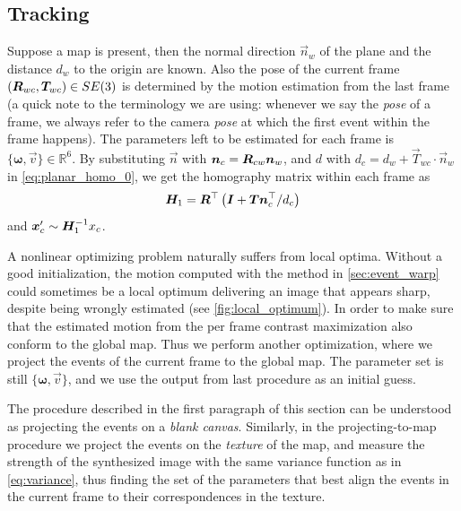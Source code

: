 \subsection{Tracking}
\label{sec:tracking}
Suppose a map is present, then the normal direction $\vec{n}_w$ of the
plane and the distance $d_w$ to the origin are known. Also the pose of
the current frame $(\mat{R}_{wc}, \vec{T}_{wc})\in SE(3)$ is
determined by the motion estimation from the last frame (a quick note
to the terminology we are using: whenever we say the \textit{pose} of
a frame, we always refer to the camera \textit{pose} at which the
first event within the frame happens). The parameters left to be
estimated for each frame is
$\{\bm{\omega},\vec{v}\}\in\mathbb{R}^6$. By substituting $\vec{n}$
with $\vec{n}_c = \mat{R}_{cw}\vec{n}_w$, and $d$ with
$d_c = d_w+\vec{T}_{wc}\cdot\vec{n}_w$ in \cref{eq:planar_homo_0}, we
get the homography matrix within each frame as
\begin{equation}
  \label{eq:planar_homo_1}
  \mat{H}_1=\mat{R}^\top\left(\mat{I}+\vec{T}\vec{n}_c^\top/d_c\right)
\end{equation}
and $\vec{x}'_c\sim\mat{H}_1^{-1}x_c$.

A nonlinear optimizing problem naturally suffers from local
optima. Without a good initialization, the motion computed with the
method in \cref{sec:event_warp} could sometimes be a local optimum
delivering an image that appears sharp, despite being wrongly
estimated (see \cref{fig:local_optimum}). In order to make sure that
the estimated motion from the per frame contrast maximization also
conform to the global map. Thus we perform another optimization, where
we project the events of the current frame to the global map. The
parameter set is still $\{\bm{\omega},\vec{v}\}$, and we use the
output from last procedure as an initial guess.

The procedure described in the first paragraph of this section can be
understood as projecting the events on a \textit{blank
  canvas}. Similarly, in the projecting-to-map procedure we project
the events on the \textit{texture} of the map, and measure the
strength of the synthesized image with the same variance function as
in \cref{eq:variance}, thus finding the set of the parameters that
best align the events in the current frame to their correspondences in
the texture.

